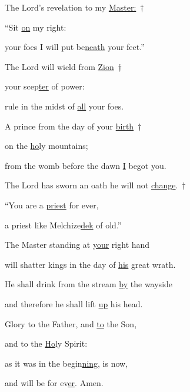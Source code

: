 
\noindent The Lord’s revelation to my \uline{Master:}~†~\nopagebreak

“Sit \uline{on} my right:~\GreStar{}~\nopagebreak

your foes I will put be\uline{neath} your feet.”

\noindent The Lord will wield from \uline{Zion}~†~\nopagebreak

your scep\uline{ter} of power:~\GreStar{}~\nopagebreak

rule in the midst of \uline{all} your foes.

\noindent A prince from the day of your \uline{birth}~†~\nopagebreak

on the \uline{ho}ly mountains;~\GreStar{}~\nopagebreak

from the womb before the dawn \uline{I} begot you.

\noindent The Lord has sworn an oath he will not \uline{change}.~†~\nopagebreak

“You are a \uline{priest} for ever,~\GreStar{}~\nopagebreak

a priest like Melchize\uline{dek} of old.”

\noindent The Master standing at \uline{your} right hand~\GreStar{}~\nopagebreak

will shatter kings in the day of \uline{his} great wrath.

\noindent He shall drink from the stream \uline{by} the wayside~\GreStar{}~\nopagebreak

and therefore he shall lift \uline{up} his head.

\noindent Glory to the Father, and \uline{to} the Son,~\GreStar{}~\nopagebreak

and to the \uline{Ho}ly Spirit:

\noindent as it was in the begin\uline{ning}, is now,~\GreStar{}~\nopagebreak

and will be for ev\uline{er}. Amen.
